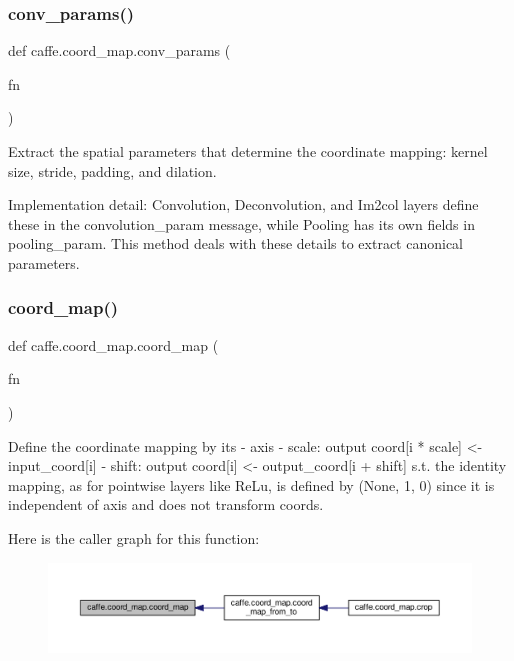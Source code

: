\subsubsection{\texorpdfstring{conv\+\_\+params()}{conv\_params()}}
{\footnotesize\ttfamily def caffe.\+coord\+\_\+map.\+conv\+\_\+params (\begin{DoxyParamCaption}\item[{}]{fn }\end{DoxyParamCaption})}

\begin{DoxyVerb}Extract the spatial parameters that determine the coordinate mapping:
kernel size, stride, padding, and dilation.

Implementation detail: Convolution, Deconvolution, and Im2col layers
define these in the convolution_param message, while Pooling has its
own fields in pooling_param. This method deals with these details to
extract canonical parameters.
\end{DoxyVerb}
 \mbox{\label{namespacecaffe_1_1coord__map_a0f5ba2053a2fd10038360dea8b2e5b9b}} 
\subsubsection{\texorpdfstring{coord\+\_\+map()}{coord\_map()}}
{\footnotesize\ttfamily def caffe.\+coord\+\_\+map.\+coord\+\_\+map (\begin{DoxyParamCaption}\item[{}]{fn }\end{DoxyParamCaption})}

\begin{DoxyVerb}Define the coordinate mapping by its
- axis
- scale: output coord[i * scale] <- input_coord[i]
- shift: output coord[i] <- output_coord[i + shift]
s.t. the identity mapping, as for pointwise layers like ReLu, is defined by
(None, 1, 0) since it is independent of axis and does not transform coords.
\end{DoxyVerb}
 Here is the caller graph for this function\+:
\nopagebreak
\begin{figure}[H]
\begin{center}
\leavevmode
\includegraphics[width=350pt]{namespacecaffe_1_1coord__map_a0f5ba2053a2fd10038360dea8b2e5b9b_icgraph}
\end{center}
\end{figure}
\mbox{\label{namespacecaffe_1_1coord__map_abf9ba4c31e6e4f0bcd3130ea9001514b}} 
